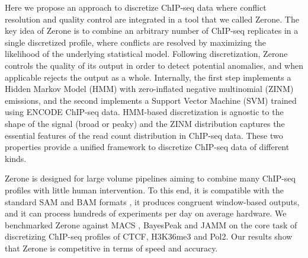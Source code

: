 \documentclass{bioinfo}
\begin{document}
Here we propose an approach to discretize ChIP-seq data where conflict
resolution and quality control are integrated in a tool that we called
Zerone. The key idea of Zerone is to combine an arbitrary number of
ChIP-seq replicates in a single discretized profile, where conflicts are
resolved by maximizing the likelihood of the underlying statistical model.
Following discretization, Zerone controls the quality of its output in
order to detect potential anomalies, and when applicable rejects the
output as a whole. Internally, the first step implements a Hidden Markov
Model (HMM) with zero-inflated negative multinomial (ZINM) emissions, and
the second implements a Support Vector Machine (SVM) trained using ENCODE
ChIP-seq data. HMM-based discretization is agnostic to the shape of the
signal (broad or peaky) and the ZINM distribution captures the essential
features of the read count distribution in ChIP-seq data. These two
properties provide a unified framework to discretize ChIP-seq data of
different kinds.

Zerone is designed for large volume pipelines aiming to combine many
ChIP-seq profiles with little human intervention. To this end, it is
compatible with the standard SAM and BAM formats \citep{pmid19505943},
it produces congruent window-based outputs, and it can process hundreds
of experiments per day on average hardware. We benchmarked Zerone against
MACS \citep{pmid18798982}, BayesPeak \citep{pmid19772557} and
JAMM \citep{pmid25223640} on the core
task of discretizing ChIP-seq profiles of CTCF, H3K36me3 and Pol2. Our
results show that Zerone is competitive in terms of speed and accuracy.
\end{document}
